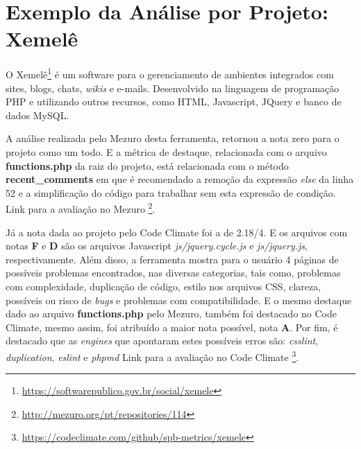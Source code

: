 
\section{Exemplo da Análise por Projeto: Xemelê}

O Xemelê\footnote{\url{https://softwarepublico.gov.br/social/xemele}} é um
software para o gerenciamento de ambientes integrados com sites, blogs, chats,
\textit{wikis} e e-mails. Desenvolvido na linguagem de programação PHP e
utilizando outros recursos, como HTML, Javascript, JQuery e banco de dados MySQL.

A análise realizada pelo Mezuro desta ferramenta, retornou a nota zero para o
projeto como um todo. E a métrica de destaque, relacionada com o arquivo
\textbf{functions.php} da raiz do projeto, está relacionada com o método
\textbf{recent\_comments} em que é recomendado a remoção da expressão
\textit{else} da linha 52 e a simplificação do código para trabalhar sem esta
expressão de condição. Link para a avaliação no Mezuro
\footnote{\url{http://mezuro.org/pt/repositories/114}}.

Já a nota dada ao projeto pelo Code Climate foi a de 2.18/4. E os arquivos com
notas \textbf{F} e \textbf{D} são os arquivos Javascript \textit{js/jquery.cycle.js}
e \textit{js/jquery.js}, respectivamente. Além disso, a ferramenta mostra para o
usuário 4 páginas de possíveis problemas encontrados, nas diversas categorias,
tais como, problemas com complexidade, duplicação de código, estilo nos arquivos
CSS, clareza, possíveis ou risco de \textit{bugs} e problemas com compatibilidade. E o
mesmo destaque dado ao arquivo \textbf{functions.php} pelo Mezuro, também foi
destacado no Code Climate, mesmo assim, foi atribuído a maior nota possível, nota
\textbf{A}. Por fim, é destacado que as \textit{engines} que apontaram estes possíveis
erros são: \textit{csslint}, \textit{duplication}, \textit{eslint} e
\textit{phpmd} Link para a avaliação no Code Climate
\footnote{\url{https://codeclimate.com/github/spb-metrics/xemele}}.

